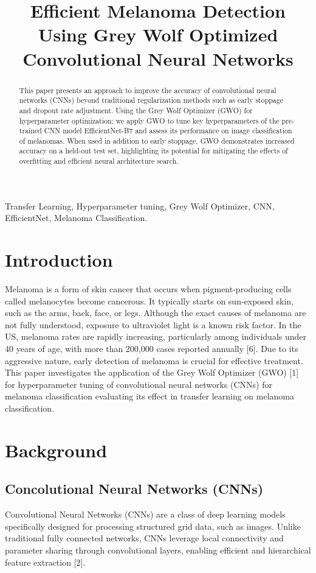 \documentclass[conference]{IEEEtran}
\title{Efficient Melanoma Detection Using Grey Wolf Optimized Convolutional Neural Networks}
\author{
    \IEEEauthorblockN{Raam Pravin}
    \IEEEauthorblockA{
        Department of Biostatistics \\
        University of Michigan \\
        Ann Arbor, Michigan \\
        rpravin@umich.edu
    }
}
\begin{document}
\maketitle

\begin{abstract}
This paper presents an approach to improve the accuracy of convolutional neural networks (CNNs) beyond traditional regularization methods such as early stoppage and dropout rate adjustment. Using the Grey Wolf Optimizer (GWO) for hyperparameter optimization; we apply GWO to tune key hyperparameters of the pre-trained CNN model EfficientNet-B7 and assess its performance on image classification of melanomas. When used in addition to early stoppage, GWO demonstrates increased accuracy on a held-out test set, highlighting its potential for mitigating the effects of overfitting and efficient neural architecture search.
\end{abstract}

\begin{IEEEkeywords}
Transfer Learning, Hyperparameter tuning, Grey Wolf Optimizer, CNN, EfficientNet, Melanoma Classification.
\end{IEEEkeywords}

\section{Introduction}
Melanoma is a form of skin cancer that occurs when pigment-producing cells called melanocytes become cancerous. It typically starts on sun-exposed skin, such as the arms, back, face, or legs. Although the exact causes of melanoma are not fully understood, exposure to ultraviolet light is a known risk factor. In the US, melanoma rates are rapidly increasing, particularly among individuals under 40 years of age, with more than 200,000 cases reported annually [6]. Due to its aggressive nature, early detection of melanoma is crucial for effective treatment. This paper investigates the application of the Grey Wolf Optimizer (GWO) [1] for hyperparameter tuning of convolutional neural networks (CNNs) for melanoma classification evaluating its effect in transfer learning on melanoma classification.

\section{Background}

\subsection {Concolutional Neural Networks (CNNs)}
Convolutional Neural Networks (CNNs) are a class of deep learning models specifically designed for processing structured grid data, such as images. Unlike traditional fully connected networks, CNNs leverage local connectivity and parameter sharing through convolutional layers, enabling efficient and hierarchical feature extraction [2].
\end{document}
